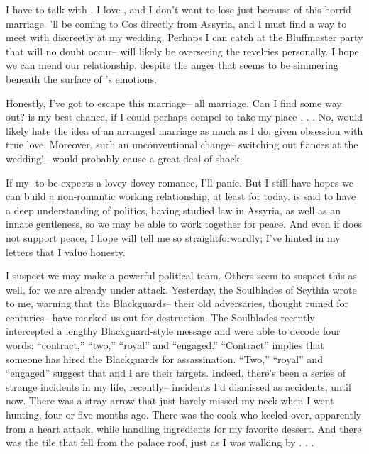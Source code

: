 \documentclass[char]{Kos}
\begin{document}
I have to talk with \cPoet{}. I love \cPoet{\them}, and I don't want to lose \cPoet{\them} just because of this horrid marriage. \cPoet{\They}'ll be coming to Cos directly from Assyria, and I must find a way to meet with \cPoet{\them} discreetly at my wedding. Perhaps I can catch \cPoet{\them} at the Bluffmaster party that will no doubt occur-- \cPoet{} will likely be overseeing the revelries personally. I hope we can mend our relationship, despite the anger that seems to be simmering beneath the surface of \cPoet{}'s emotions.

Honestly, I've got to escape this marriage-- all marriage. Can I find some way out? \cPoet{} is my best chance, if I could perhaps compel \cPoet{} to take my place . . . No, \cPoet{\they} would likely hate the idea of an arranged marriage as much as I do, given \cPoet{\their} obsession with true love. Moreover, such an unconventional change-- switching out fiances at the wedding!-- would probably cause a great deal of shock.

 If my \cBride{\partner}-to-be expects a lovey-dovey romance, I'll panic. But I still have hopes we can build a non-romantic working relationship, at least for today. \cBride{\They} is said to have a deep understanding of politics, having studied law in Assyria, as well as an innate gentleness, so we may be able to work together for peace. And even if \cBride{\they} does not support peace, I hope \cBride{\they} will tell me so straightforwardly; I've hinted in my letters that I value honesty.
 
I suspect we may make a powerful political team. Others seem to suspect this as well, for we are already under attack. Yesterday, the Soulblades of Scythia wrote to me, warning that the Blackguards-- their old adversaries, thought ruined for centuries-- have marked us out for destruction. The Soulblades recently intercepted a lengthy Blackguard-style message and were able to decode four words: ``contract,'' ``two,'' ``royal'' and ``engaged.'' ``Contract'' implies that someone has hired the Blackguards for assassination. ``Two,'' ``royal'' and ``engaged'' suggest that \cBride{} and I are their targets. Indeed, there's been a series of strange incidents in my life, recently-- incidents I'd dismissed as accidents, until now. There was a stray arrow that just barely missed my neck when I went hunting, four or five months ago. There was the cook who keeled over, apparently from a heart attack, while handling ingredients for my favorite dessert. And there was the tile that fell from the palace roof, just as I was walking by . . . 
\end{document}
